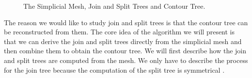 \begin{figure}[h]
    \caption{The Simplicial Mesh, Join and Split Trees and Contour Tree.}%
    \label{fig:mesh-join-split-contour}%
\end{figure}

The reason we would like to study join and split trees is that the contour tree can be reconstructed from them. The core idea of the algorithm we will present is that we can derive the join and split trees directly from the simplicial mesh and then combine them to obtain the contour tree. We will first describe how the join and split trees are computed from the mesh. We only have to describe the process for the join tree because the computation of the split tree is symmetrical \cite{ct-big-paper}.

